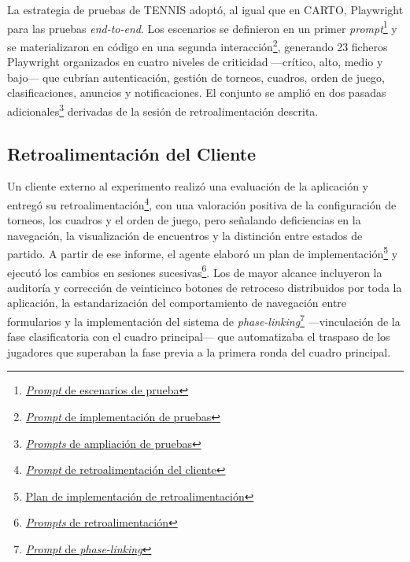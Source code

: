 La estrategia de pruebas de \ac{TENNIS} adoptó, al igual que en \ac{CARTO}, Playwright para las pruebas \textit{end-to-end}. Los escenarios se definieron en un primer \textit{prompt}\footnote{\href{https://github.com/alu0101549491/TFG-Fabian-Gonzalez-Lence/blob/main/resources/prompts/5-TennisTournamentManager/5-TestingDeLaAplicacion/test-scenarios.prompt.md}{\textit{Prompt} de escenarios de prueba}} y se materializaron en código en una segunda interacción\footnote{\href{https://github.com/alu0101549491/TFG-Fabian-Gonzalez-Lence/blob/main/resources/prompts/5-TennisTournamentManager/5-TestingDeLaAplicacion/test-implementations.prompt.md}{\textit{Prompt} de implementación de pruebas}}, generando 23 ficheros Playwright organizados en cuatro niveles de criticidad ---crítico, alto, medio y bajo--- que cubrían autenticación, gestión de torneos, cuadros, orden de juego, clasificaciones, anuncios y notificaciones. El conjunto se amplió en dos pasadas adicionales\footnote{\href{https://github.com/alu0101549491/TFG-Fabian-Gonzalez-Lence/tree/main/resources/prompts/5-TennisTournamentManager/5-TestingDeLaAplicacion}{\textit{Prompts} de ampliación de pruebas}} derivadas de la sesión de retroalimentación descrita.

\subsection{Retroalimentación del Cliente}

Un cliente externo al experimento realizó una evaluación de la aplicación y entregó su retroalimentación\footnote{\href{https://github.com/alu0101549491/TFG-Fabian-Gonzalez-Lence/blob/main/resources/prompts/5-TennisTournamentManager/6-FeedbackDeLaAplicacion/client-feedback.prompt.md}{\textit{Prompt} de retroalimentación del cliente}}, con una valoración positiva de la configuración de torneos, los cuadros y el orden de juego, pero señalando deficiencias en la navegación, la visualización de encuentros y la distinción entre estados de partido. A partir de ese informe, el agente elaboró un plan de implementación\footnote{\href{https://github.com/alu0101549491/TFG-Fabian-Gonzalez-Lence/blob/main/projects/5-TennisTournamentManager/docs/FEEDBACK-IMPLEMENTATION-PLAN.md}{Plan de implementación de retroalimentación}} y ejecutó los cambios en sesiones sucesivas\footnote{\href{https://github.com/alu0101549491/TFG-Fabian-Gonzalez-Lence/tree/main/resources/prompts/5-TennisTournamentManager/6-FeedbackDeLaAplicacion}{\textit{Prompts} de retroalimentación}}. Los de mayor alcance incluyeron la auditoría y corrección de veinticinco botones de retroceso distribuidos por toda la aplicación, la estandarización del comportamiento de navegación entre formularios y la implementación del sistema de \textit{phase-linking}\footnote{\href{https://github.com/alu0101549491/TFG-Fabian-Gonzalez-Lence/blob/main/resources/prompts/5-TennisTournamentManager/6-FeedbackDeLaAplicacion/phase-linking.prompt.md}{\textit{Prompt} de \textit{phase-linking}}} ---vinculación de la fase clasificatoria con el cuadro principal--- que automatizaba el traspaso de los jugadores que superaban la fase previa a la primera ronda del cuadro principal.

